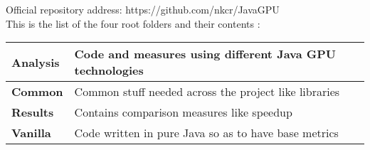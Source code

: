 Official repository address: https://github.com/nkcr/JavaGPU \\

This is the list of the four root folders and their contents : \\

\renewcommand{\arraystretch}{2}
\begin{tabular}{ l|l } 
 \hline
 \textbf{Analysis} & Code and measures using different Java GPU technologies \\
 \hline
 \textbf{Common} & Common stuff needed across the project like libraries \\ 
 \hline
 \textbf{Results} & Contains comparison measures like speedup \\ 
 \hline
 \textbf{Vanilla} & Code written in pure Java so as to have base metrics \\ 
 \hline
\end{tabular}
\renewcommand{\arraystretch}{1}